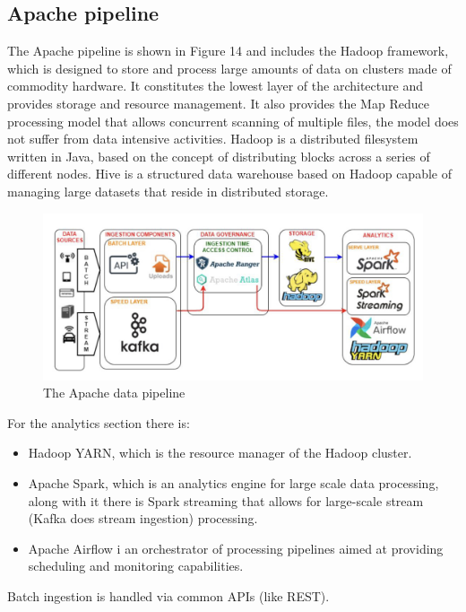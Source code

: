 \subsection{Apache pipeline}
The Apache pipeline is shown in Figure 14 and includes the Hadoop framework, which is designed to store and process large amounts of data on clusters made of commodity hardware. It constitutes the lowest layer of the architecture and provides storage and resource management. \n
It also provides the Map Reduce processing model that allows concurrent scanning of multiple files, the model does not suffer from data intensive activities. \n
Hadoop is a distributed filesystem written in Java, based on the concept of distributing blocks across a series of different nodes. Hive is a structured data warehouse based on Hadoop capable of managing large datasets that reside in distributed storage.
\begin{figure}
    \centering
    \includegraphics[scale=0.2]{Images/apache_architecture.jpeg}
    \caption{The Apache data pipeline}
\end{figure}
For the analytics section there is:
\begin{itemize}
    \item Hadoop YARN, which is the resource manager of the Hadoop cluster.
    \item Apache Spark, which is an analytics engine for large scale data processing, along with it there is Spark streaming that allows for large-scale stream (Kafka does stream ingestion) processing.
    \item Apache Airflow i an orchestrator of processing pipelines aimed at providing scheduling and monitoring capabilities.
\end{itemize}
Batch ingestion is handled via common APIs (like REST).

